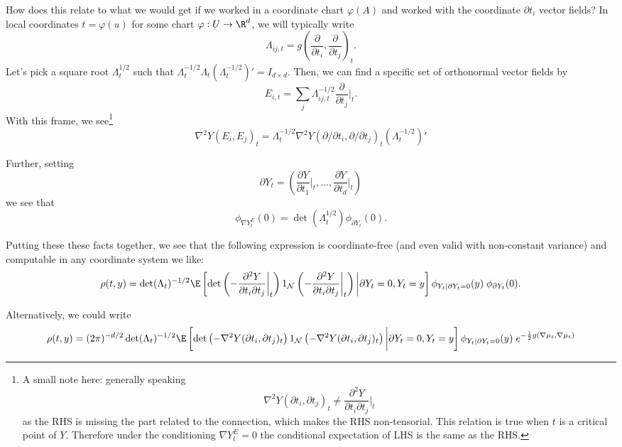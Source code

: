 \documentclass{article}
\begin{document}
How does this relate to what we would get if we worked in a coordinate chart $\varphi(A)$ and worked with the coordinate $\partial t_i$ vector fields? In local coordinates $t=\varphi(u)$ for some chart
$\varphi:U \to \R^d$, we will
typically write
\begin{equation}
\Lambda_{ij,t} = g\left(\frac{\partial}{\partial t_i}, \frac{\partial}{\partial t_j}\right)_t.
  \end{equation}
Let's pick a square root $\Lambda_t^{1/2}$ such that $\Lambda_t^{-1/2} \Lambda_t (\Lambda_t^{-1/2})'=I_{d \times d}$. Then, we can find a specific set of orthonormal vector fields by
$$
E_{i,t} = \sum_j \Lambda^{-1/2}_{ij,t} \frac{\partial}{\partial t_j} \biggl|_t.
$$
With this frame, we see\footnote{A small note here: generally speaking
\begin{equation}
\nabla^2 Y(\partial t_i, \partial t_j)_t \neq \frac{\partial^2 Y}{\partial t_i \partial t_j}\biggl|_t
  \end{equation}
as the RHS is missing the part related to the connection, which makes the RHS non-tensorial. This relation is true
when $t$ is a critical point of $Y$. Therefore under the conditioning
$\nabla Y^E_t=0$ the conditional expectation of LHS is the same as the RHS.}
$$
\nabla^2 Y(E_i,E_j)_t = \Lambda^{-1/2}_t \nabla^2 Y(\partial/\partial t_i, \partial/\partial t_j)_t (\Lambda^{-1/2}_t)'
$$

Further, setting
$$
\partial Y_t = \left(\frac{\partial Y}{\partial t_1}\biggl|_t, \dots, \frac{\partial Y}{\partial t_d}\biggl|_t \right)
$$
we see that
$$
\phi_{\nabla Y_t^E}(0) = \det(\Lambda_t^{1/2}) \phi_{\partial Y_t}(0).
$$

Putting these these facts together, we see that the following expression is coordinate-free (and even valid with non-constant variance) and computable in any coordinate system we like:
$$
\begin{aligned}
\rho(t,y) = \det(\Lambda_t)^{-1/2} \E \left[\det\left(-\frac{\partial^2 Y}{\partial t_i \partial t_j} \biggl|_t\right) 1_{{\cal N}}\left(-\frac{\partial^2 Y}{\partial t_i \partial t_j} \biggl|_t \right) \biggl \vert \partial Y_t=0, Y_t=y\right] \phi_{Y_t|\partial Y_t=0}(y) \; \phi_{\partial Y_t}(0).
\end{aligned}
$$

Alternatively, we could write
$$
\begin{aligned}
\rho(t,y) = (2\pi)^{-d/2} \det(\Lambda_t)^{-1/2} \E \left[\det\left(-\nabla^2 Y(\partial t_i, \partial t_j)_t\right) 1_{{\cal N}}\left(-\nabla^2 Y(\partial t_i, \partial t_j)_t \right) \biggl \vert \partial Y_t=0, Y_t=y\right] \phi_{Y_t|\partial Y_t=0}(y) \; e^{-\frac{1}{2}g(\nabla \mu_t,\nabla \mu_t)}
\end{aligned}
$$
\end{document}
